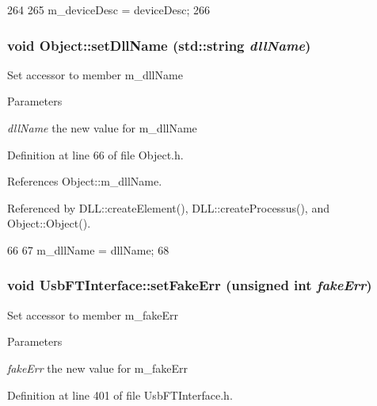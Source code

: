 \begin{DoxyCode}
264                                             {
265     m_deviceDesc = deviceDesc;
266   }
\end{DoxyCode}
\hypertarget{classObject_a870c5af919958c2136623b2d7816d123}{
\subsubsection[{setDllName}]{\setlength{\rightskip}{0pt plus 5cm}void Object::setDllName (std::string {\em dllName})}}
\label{classObject_a870c5af919958c2136623b2d7816d123}
Set accessor to member m\_\-dllName 
\begin{DoxyParams}{Parameters}
\item[{\em dllName}]the new value for m\_\-dllName \end{DoxyParams}


Definition at line 66 of file Object.h.

References Object::m\_\-dllName.

Referenced by DLL::createElement(), DLL::createProcessus(), and Object::Object().


\begin{DoxyCode}
66                                       {
67     m_dllName = dllName;
68   }
\end{DoxyCode}
\hypertarget{classUsbFTInterface_aec057577db0b913beedf1e9896498e10}{
\subsubsection[{setFakeErr}]{\setlength{\rightskip}{0pt plus 5cm}void UsbFTInterface::setFakeErr (unsigned int {\em fakeErr})}}
\label{classUsbFTInterface_aec057577db0b913beedf1e9896498e10}
Set accessor to member m\_\-fakeErr 
\begin{DoxyParams}{Parameters}
\item[{\em fakeErr}]the new value for m\_\-fakeErr \end{DoxyParams}


Definition at line 401 of file UsbFTInterface.h.

